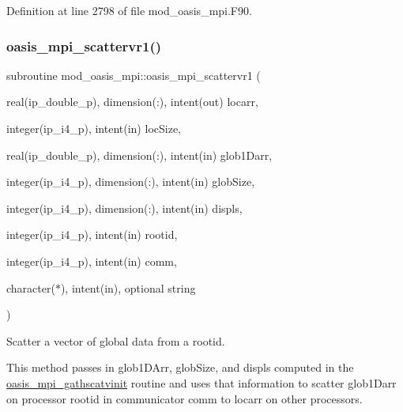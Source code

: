 Definition at line 2798 of file mod\+\_\+oasis\+\_\+mpi.\+F90.

\mbox{\label{namespacemod__oasis__mpi_a9d0d807b92d39c9789eea4744d331612}} 
\subsubsection{\texorpdfstring{oasis\+\_\+mpi\+\_\+scattervr1()}{oasis\_mpi\_scattervr1()}}
{\footnotesize\ttfamily subroutine mod\+\_\+oasis\+\_\+mpi\+::oasis\+\_\+mpi\+\_\+scattervr1 (\begin{DoxyParamCaption}\item[{real(ip\+\_\+double\+\_\+p), dimension(\+:), intent(out)}]{locarr,  }\item[{integer(ip\+\_\+i4\+\_\+p), intent(in)}]{loc\+Size,  }\item[{real(ip\+\_\+double\+\_\+p), dimension(\+:), intent(in)}]{glob1\+Darr,  }\item[{integer(ip\+\_\+i4\+\_\+p), dimension(\+:), intent(in)}]{glob\+Size,  }\item[{integer(ip\+\_\+i4\+\_\+p), dimension(\+:), intent(in)}]{displs,  }\item[{integer(ip\+\_\+i4\+\_\+p), intent(in)}]{rootid,  }\item[{integer(ip\+\_\+i4\+\_\+p), intent(in)}]{comm,  }\item[{character($\ast$), intent(in), optional}]{string }\end{DoxyParamCaption})\hspace{0.3cm}{\ttfamily [private]}}



Scatter a vector of global data from a rootid. 

This method passes in glob1\+D\+Arr, glob\+Size, and displs computed in the \hyperlink{interfacemod__oasis__mpi_1_1oasis__mpi__gathscatvinit}{oasis\+\_\+mpi\+\_\+gathscatvinit} routine and uses that information to scatter glob1\+Darr on processor rootid in communicator comm to locarr on other processors.


